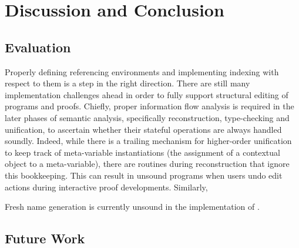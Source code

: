 \chapter{Discussion and Conclusion}


\section{Evaluation}


Properly defining referencing environments and implementing indexing with respect to them is a step in the right direction.
There are still many implementation challenges ahead in order to fully support structural editing of \Beluga programs and \Harpoon proofs.
Chiefly, proper information flow analysis is required in the later phases of semantic analysis, specifically reconstruction, type-checking and unification, to ascertain whether their stateful operations are always handled soundly.
Indeed, while there is a trailing mechanism for higher-order unification to keep track of meta-variable instantiations (the assignment of a contextual object to a meta-variable), there are routines during \LF reconstruction that ignore this bookkeeping.
This can result in unsound programs when users undo edit actions during interactive proof developments.
Similarly, 

Fresh name generation is currently unsound in the implementation of \Beluga.

\section{Future Work}



%
